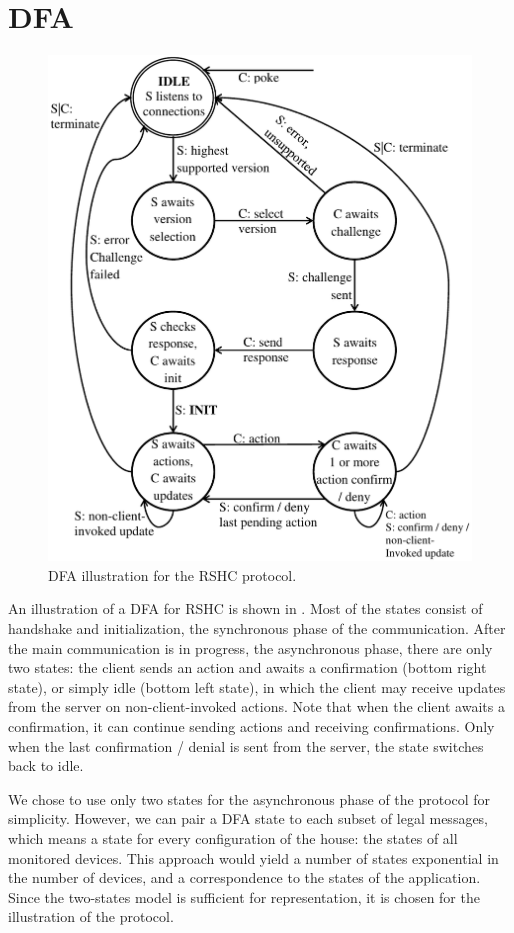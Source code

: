 \section{DFA}
\label{sec:dfa}

\begin{figure}[h]
  \centering
  \includegraphics[width=4.95in]{figures/dfa.pdf}
  \caption{DFA illustration for the RSHC protocol.}
  \label{fig:dfa:dfa}
\end{figure}

An illustration of a DFA for RSHC is shown in . Most of the states consist of handshake and initialization, the synchronous phase of the communication. After the main communication is in progress, the asynchronous phase, there are only two states: the client sends an action and awaits a confirmation (bottom right state), or simply idle (bottom left state), in which the client may receive updates from the server on non-client-invoked actions. Note that when the client awaits a confirmation, it can continue sending actions and receiving confirmations. Only when the last confirmation / denial is sent from the server, the state switches back to idle.

We chose to use only two states for the asynchronous phase of the protocol for simplicity. However, we can pair a DFA state to each subset of legal messages, which means a state for every configuration of the house: the states of all monitored devices. This approach would yield a number of states exponential in the number of devices, and a correspondence to the states of the application. Since the two-states model is sufficient for representation, it is chosen for the illustration of the protocol.
